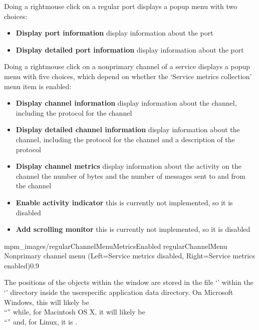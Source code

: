Doing a right\longDash{}mouse click on a regular port displays a popup menu with two
choices:
\begin{itemize}
\item\textbf{Display port information} display information about the port
\item\exSp\textbf{Display detailed port information} display information about the port
\end{itemize}
\clearpage
Doing a right\longDash{}mouse click on a non\longDash{}primary channel of a service
displays a popup menu with five choices, which depend on whether the `Service metrics
collection' menu item is enabled:
\begin{itemize}
\item\textbf{Display channel information} display information about the channel,
including the protocol for the channel
\item\exSp\textbf{Display detailed channel information} display information about the
channel, including the protocol for the channel and a description of the protocol
\item\exSp\textbf{Display channel metrics} display information about the activity on the
channel \longDash{} the number of bytes and the number of messages sent to and from the
channel
\item\exSp\textbf{Enable activity indicator} \longDash{} this is currently not
implemented, so it is disabled
\item\exSp\textbf{Add scrolling monitor} \longDash{} this is currently not implemented, so
it is disabled
\end{itemize}
%
{mpm_images/regularChannelMenuMetricsEnabled}%
{regularChannelMenu}%
{Non\longDash{}primary channel menu (Left=Service metrics disabled, Right=Service metrics
enabled)}{0.9}

The positions of the objects within the window are stored in the file
`' within the `' directory inside the
user\longDash{}specific application data directory.
On Microsoft Windows, this will likely be\\
``'' while, for Macintosh OS X, it will likely be\\
``'' and, for Linux, it is \TBD.\\
\primaryEnd{}
